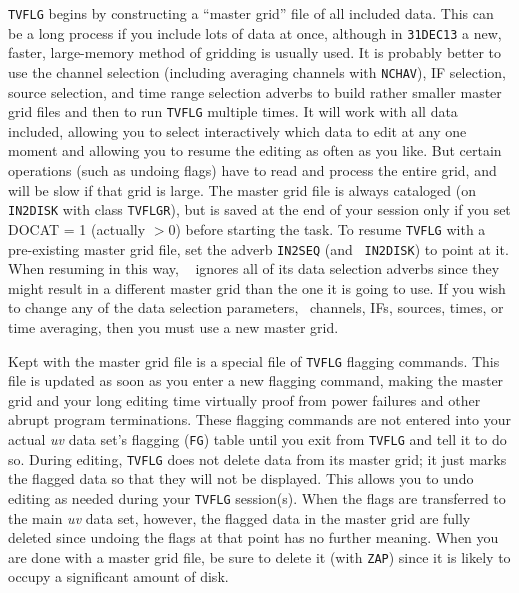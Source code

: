      {\tt TVFLG} begins by constructing a ``master grid'' file of all
included data.  This can be a long process if you include lots of data
at once, although in {\tt 31DEC13} a new, faster, large-memory method
of gridding is usually used.  It is probably better to use the channel
selection (including averaging channels with {\tt NCHAV}), IF
selection, source selection, and time range selection adverbs to build
rather smaller master grid files and then to run {\tt TVFLG} multiple
times.  It will work with all data included, allowing you to select
interactively which data to edit at any one moment and allowing you to
resume the editing as often as you like.  But certain operations (such
as undoing flags) have to read and process the entire grid, and will
be slow if that grid is large.  The master grid file is always
cataloged (on {\tt IN2DISK} with class {\tt TVFLGR}), but is saved at
the end of your session only if you set {\us DOCAT = 1} (actually $ >
0$) before starting the task.  To resume {\tt TVFLG} with a
pre-existing master grid file, set the adverb {\tt IN2SEQ} (and {\tt
IN2DISK}) to point at it.  When resuming in this way, {\tt
{}} ignores all of its data selection adverbs since they
might result in a different master grid than the one it is going to
use.  If you wish to change any of the data selection parameters, \eg\
channels, IFs, sources, times, or time averaging, then you must use a
new master grid.\Iodx{editing}\Iodx{flagging}

     Kept with the master grid file is a special file of {\tt TVFLG}
flagging commands.  This file is updated as soon as you enter a new
flagging command, making the master grid and your long editing time
virtually proof from power failures and other abrupt program
terminations.  These flagging commands are not entered into your
actual {\it uv\/} data set's flagging ({\tt FG}) table until you exit
from {\tt TVFLG} and tell it to do so.  During editing, {\tt TVFLG}
does not delete data from its master grid; it just marks the flagged
data so that they will not be displayed.  This allows you to undo
editing as needed during your {\tt TVFLG} session(s).  When the flags
are transferred to the main {\it uv\/} data set, however, the flagged
data in the master grid are fully deleted since undoing the flags at
that point has no further meaning.  When you are done with a master
grid file, be sure to delete it (with {\tt ZAP}) since it is likely to
occupy a significant amount of disk.

